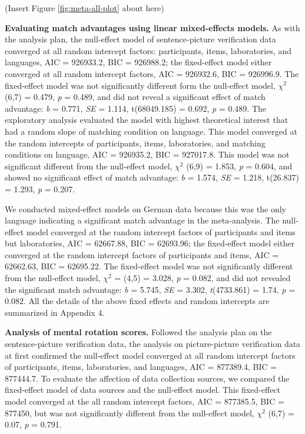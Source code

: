 \documentclass[
  man,floatsintext]{apa6}
\begin{document}
(Insert Figure \ref{fig:meta-all-plot} about here)

\textbf{Evaluating match advantages using linear mixed-effects models.} As with the analysis plan, the null-effect model of sentence-picture verification data converged at all random intercept factors: participants, items, laboratories, and languages, AIC = 926933.2, BIC = 926988.2; the fixed-effect model either converged at all random intercept factors, AIC = 926932.6, BIC = 926996.9. The fixed-effect model was not significantly different form the null-effect model, \({\chi}^2\) (6,7) = 0.479, \emph{p} = 0.489, and did not reveal a significant effect of match advantage: \emph{b} = 0.771, \emph{SE} = 1.114, t(68049.185) = 0.692, \emph{p} = 0.489. The exploratory analysis evaluated the model with highest theoretical interest that had a random slope of matching condition on language. This model converged at the random intercepts of participants, items, laboratories, and matching conditions on language, AIC = 926935.2, BIC = 927017.8. This model was not significant different from the null-effect model, \({\chi}^2\) (6,9) = 1.853, \emph{p} = 0.604, and showed no significant effect of match advantage: \emph{b} = 1.574, \emph{SE} = 1.218, t(26.837) = 1.293, \emph{p} = 0.207.

We conducted mixed-effect models on German data because this was the only language indicating a significant match advantage in the meta-analysis. The null-effect model converged at the random intercept factors of participants and items but laboratories, AIC = 62667.88, BIC = 62693.96; the fixed-effect model either converged at the random intercept factors of participants and items, AIC = 62662.63, BIC = 62695.22. The fixed-effect model was not significantly different from the null-effect model, \({\chi}^2\) = (4,5) = 3.028, \emph{p} = 0.082, and did not revealed the significant match advantage: \emph{b} = 5.745, \emph{SE} = 3.302, \emph{t}(4733.861) = 1.74, \emph{p} = 0.082. All the details of the above fixed effects and random intercepts are summarized in Appendix 4.

\textbf{Analysis of mental rotation scores.} Followed the analysis plan on the sentence-picture verification data, the analysis on picture-picture verification data at first confirmed the null-effect model converged at all random intercept factors of participants, items, laboratories, and languages, AIC = 877389.4, BIC = 877444.7. To evaluate the affection of data collection sources, we compared the fixed-effect model of data sources and the null-effect model. This fixed-effect model converged at the all random intercept factors, AIC = 877385.5, BIC = 877450, but was not significantly different from the null-effect model, \({\chi}^2\) (6,7) = 0.07, \emph{p} = 0.791.
\end{document}
